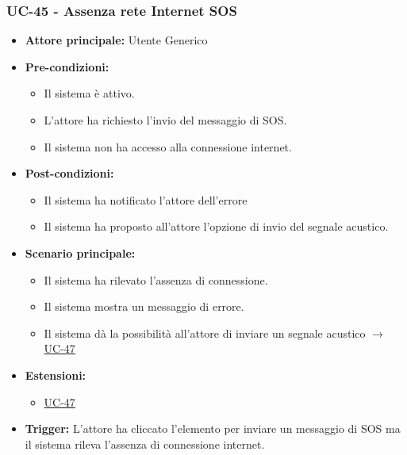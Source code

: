 \documentclass[a4paper,12pt]{article}
\begin{document}
\subsubsection{UC-45 - Assenza rete Internet SOS} \label{sec:UC-45}
\begin{itemize}
    \item \textbf{Attore principale:} Utente Generico
    \item \textbf{Pre-condizioni:} 
    \begin{itemize}
        \item Il sistema è attivo.
	    \item L'attore ha richiesto l'invio del messaggio di SOS.
	    \item Il sistema non ha accesso alla connessione internet.
    \end{itemize}	

    \item \textbf{Post-condizioni:}
    \begin{itemize}
        \item Il sistema ha notificato l'attore dell'errore
        \item Il sistema ha proposto all'attore l'opzione di invio del segnale acustico.
    \end{itemize}
    \item \textbf{Scenario principale:} 
    \begin{itemize}
        \item Il sistema ha rilevato l'assenza di connessione.
        \item Il sistema mostra un messaggio di errore.
        \item Il sistema dà la possibilità all'attore di inviare un segnale acustico $\rightarrow$ \hyperref[sec:UC-47]{UC-47}
    \end{itemize}
    \item \textbf{Estensioni:}
    \begin{itemize}
        \item \hyperref[sec:UC-47]{UC-47}
    \end{itemize}
    \item \textbf{Trigger:} L'attore ha cliccato l'elemento per inviare un messaggio di SOS ma il sistema rileva l'assenza di connessione internet.
\end{itemize}
\end{document}
